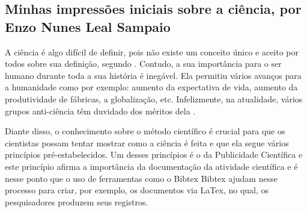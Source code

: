 \subsection{Minhas impressões iniciais sobre a ciência, por Enzo Nunes Leal Sampaio}

A ciência é algo difícil de definir, pois não existe um conceito único e aceito por todos sobre sua definição, segundo \citet{schwartzman_ciencia_1984}. Contudo, a sua importância para o ser humano durante toda a sua história é inegável. Ela permitiu vários avanços para a humanidade como por exemplo: aumento da expectativa de vida, aumento da produtividade de fábricas, a globalização, etc. Infelizmente, na atualidade, vários grupos anti-ciência têm duvidado dos méritos dela \citet{scherma_relatos_2020}.

Diante disso, o conhecimento sobre o método científico é crucial para que os cientistas possam tentar mostrar como a ciência é feita e que ela segue vários princípios pré-estabelecidos. Um desses princípios é o da Publicidade Científica e este princípio afirma a importância da documentação da atividade científica e é nesse ponto que o uso de ferramentas como o Bibtex \gls{Bibtex} ajudam nesse processo para criar, por exemplo, os documentos via LaTex, no qual, os pesquisadores produzem seus registros.